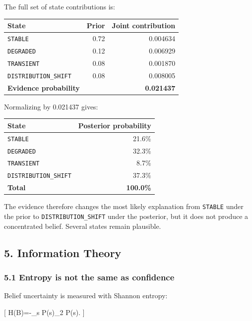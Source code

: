 \documentclass[
]{article}
\begin{document}
The full set of state contributions is:

\begin{longtable}[]{@{}lrr@{}}
\toprule\noalign{}
State & Prior & Joint contribution \\
\midrule\noalign{}
\endhead
\bottomrule\noalign{}
\endlastfoot
\texttt{STABLE} & 0.72 & 0.004634 \\
\texttt{DEGRADED} & 0.12 & 0.006929 \\
\texttt{TRANSIENT} & 0.08 & 0.001870 \\
\texttt{DISTRIBUTION\_SHIFT} & 0.08 & 0.008005 \\
\textbf{Evidence probability} & & \textbf{0.021437} \\
\end{longtable}

Normalizing by 0.021437 gives:

\begin{longtable}[]{@{}lr@{}}
\toprule\noalign{}
State & Posterior probability \\
\midrule\noalign{}
\endhead
\bottomrule\noalign{}
\endlastfoot
\texttt{STABLE} & 21.6\% \\
\texttt{DEGRADED} & 32.3\% \\
\texttt{TRANSIENT} & 8.7\% \\
\texttt{DISTRIBUTION\_SHIFT} & 37.3\% \\
\textbf{Total} & \textbf{100.0\%} \\
\end{longtable}

The evidence therefore changes the most likely explanation from
\texttt{STABLE} under the prior to \texttt{DISTRIBUTION\_SHIFT} under
the posterior, but it does not produce a concentrated belief. Several
states remain plausible.

\subsection{5. Information Theory}\label{information-theory}

\subsubsection{5.1 Entropy is not the same as
confidence}\label{entropy-is-not-the-same-as-confidence}

Belief uncertainty is measured with Shannon entropy:

{[} H(B)=-\sum\_s P(s)\log\_2 P(s). {]}
\end{document}

